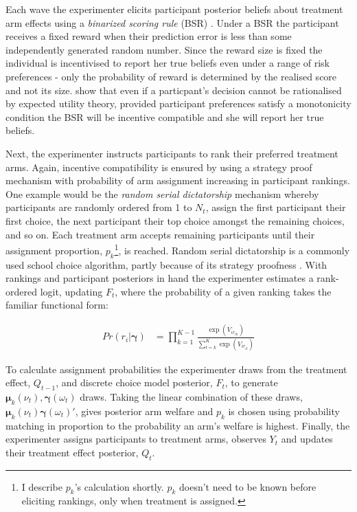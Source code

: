 \documentclass[twoside,11pt]{article}
\begin{document}
Each wave the experimenter elicits participant posterior beliefs about treatment 
arm effects using a \textit{binarized scoring rule} (BSR) \citep{hossain}. Under a BSR the participant 
receives a fixed reward when their prediction error is less than some independently 
generated random number. Since the reward size is fixed the individual is 
incentivised to report her true beliefs even under a range of risk preferences - only the 
probability of reward is determined by the realised score and not its size. \cite{hossain} 
show that even if a particpant's decision cannot be rationalised by expected 
utility theory, provided participant preferences satisfy a monotonicity condition 
the BSR will be incentive compatible and she will report her true beliefs.

Next, the experimenter instructs participants to rank their preferred treatment 
arms. Again, incentive compatibility is ensured by using a strategy proof mechanism
with probability of arm assignment increasing in participant rankings. One example 
would be the \textit{random serial dictatorship} mechanism whereby participants 
are randomly ordered from 1 to $N_t$, assign the first participant their first choice,
the next participant their top choice amongst the remaining choices, and so on. 
Each treatment arm accepts remaining participants until their assignment proportion, 
$p_k$\footnote{I describe $p_k$'s calculation shortly. $p_k$ doesn't need to be known 
before eliciting rankings, only when treatment is assigned.}, is reached. Random 
serial dictatorship is a commonly used school choice algorithm, partly because of 
its strategy proofness \citep{abdulkadirolu2003a}.  With rankings 
and participant posteriors in hand the experimenter estimates a rank-ordered logit, 
updating $F_t$, 
where the probability of a given ranking takes the familiar functional form:

\begin{align*}
  Pr(r_i | \bm{\gamma}) &= \prod^{K-1}_{k=1} \frac{\exp(V_{ir_{ik}})}{\sum^K_{l=k}\exp(V_{ir_{il}})}
\end{align*}


To calculate assignment probabilities the experimenter draws from the treatment
effect, $Q_{t-1}$, and discrete choice model posterior, $F_t$, to generate $\bm{\mu}_k(\nu_t), \bm{\gamma}(\omega_t)$ 
draws. Taking the linear combination of these draws, 
$\bm{\mu}_k(\nu_{t}) \bm{\gamma}(\omega_{t})'$, gives posterior arm welfare and 
$p_k$ is chosen using probability matching in proportion to the probability an 
arm's welfare is highest. Finally, the experimenter assigns participants to 
treatment arms, observes $Y_t$ and updates their treatment effect posterior, $Q_t$.
\end{document}
